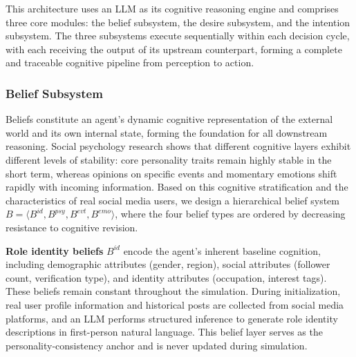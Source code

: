 \documentclass[a4paper,fleqn]{cas-dc}
\begin{document}
This architecture uses an LLM as its cognitive reasoning engine and comprises three core modules: the belief subsystem, the desire subsystem, and the intention subsystem. The three subsystems execute sequentially within each decision cycle, with each receiving the output of its upstream counterpart, forming a complete and traceable cognitive pipeline from perception to action.

\subsubsection{Belief Subsystem}

Beliefs constitute an agent's dynamic cognitive representation of the external world and its own internal state, forming the foundation for all downstream reasoning. Social psychology research shows that different cognitive layers exhibit different levels of stability: core personality traits remain highly stable in the short term, whereas opinions on specific events and momentary emotions shift rapidly with incoming information. Based on this cognitive stratification and the characteristics of real social media users, we design a hierarchical belief system $B = \langle B^{id}, B^{psy}, B^{evt}, B^{emo} \rangle$, where the four belief types are ordered by decreasing resistance to cognitive revision.

\textbf{Role identity beliefs} $B^{id}$ encode the agent's inherent baseline cognition, including demographic attributes (gender, region), social attributes (follower count, verification type), and identity attributes (occupation, interest tags). These beliefs remain constant throughout the simulation. During initialization, real user profile information and historical posts are collected from social media platforms, and an LLM performs structured inference to generate role identity descriptions in first-person natural language. This belief layer serves as the personality-consistency anchor and is never updated during simulation.
\end{document}
